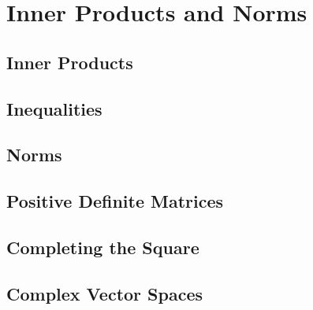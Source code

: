 \chapter{Inner Products and Norms}

\section{Inner Products}

\section{Inequalities}

\section{Norms}

\section{Positive Definite Matrices}

\section{Completing the Square}

\section{Complex Vector Spaces}